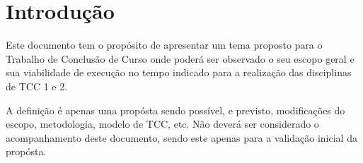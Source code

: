 \section{Introdução}

Este documento tem o propósito de apresentar um tema proposto para o
Trabalho de Conclusão de Curso onde poderá ser observado o seu escopo
geral e sua viabilidade de execução no tempo indicado para a
realização das disciplinas de TCC 1 e 2.

A definição é apenas uma propósta sendo possível, e previsto,
modificações do escopo, metodologia, modelo de TCC, etc. Não deverá
ser considerado o acompanhamento deste documento, sendo este apenas
para a validação inicial da propósta.
